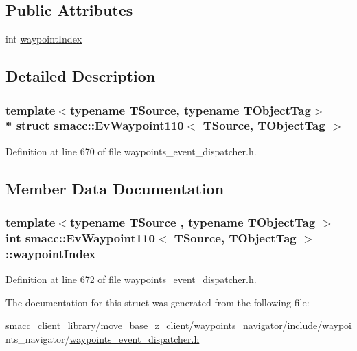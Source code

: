 \subsection*{Public Attributes}
\begin{DoxyCompactItemize}
\item 
int \hyperlink{structsmacc_1_1EvWaypoint110_a8af98dff10a9be8ebc345f3a151e8e6b}{waypoint\+Index}
\end{DoxyCompactItemize}


\subsection{Detailed Description}
\subsubsection*{template$<$typename T\+Source, typename T\+Object\+Tag$>$\\*
struct smacc\+::\+Ev\+Waypoint110$<$ T\+Source, T\+Object\+Tag $>$}



Definition at line 670 of file waypoints\+\_\+event\+\_\+dispatcher.\+h.



\subsection{Member Data Documentation}
\subsubsection[{\texorpdfstring{waypoint\+Index}{waypointIndex}}]{\setlength{\rightskip}{0pt plus 5cm}template$<$typename T\+Source , typename T\+Object\+Tag $>$ int {\bf smacc\+::\+Ev\+Waypoint110}$<$ T\+Source, T\+Object\+Tag $>$\+::waypoint\+Index}\hypertarget{structsmacc_1_1EvWaypoint110_a8af98dff10a9be8ebc345f3a151e8e6b}{}\label{structsmacc_1_1EvWaypoint110_a8af98dff10a9be8ebc345f3a151e8e6b}


Definition at line 672 of file waypoints\+\_\+event\+\_\+dispatcher.\+h.



The documentation for this struct was generated from the following file\+:\begin{DoxyCompactItemize}
\item 
smacc\+\_\+client\+\_\+library/move\+\_\+base\+\_\+z\+\_\+client/waypoints\+\_\+navigator/include/waypoints\+\_\+navigator/\hyperlink{waypoints__event__dispatcher_8h}{waypoints\+\_\+event\+\_\+dispatcher.\+h}\end{DoxyCompactItemize}
